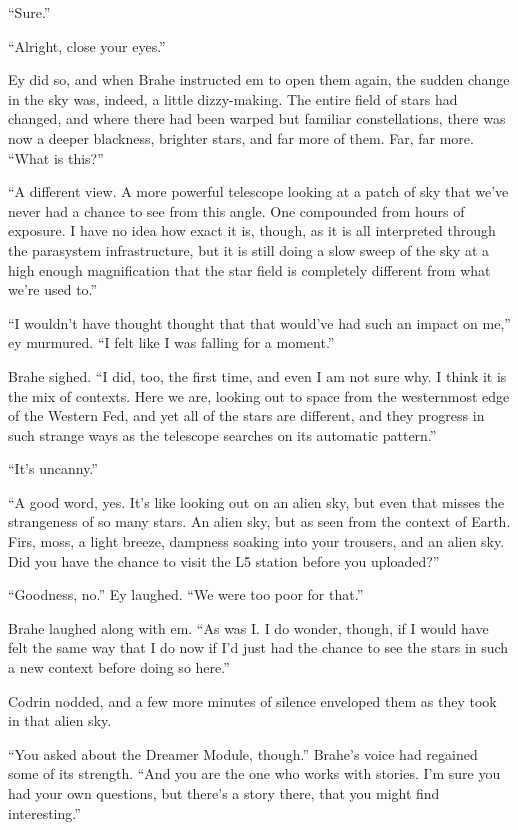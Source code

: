 ``Sure.''

``Alright, close your eyes.''

Ey did so, and when Brahe instructed em to open them again, the sudden change in the sky was, indeed, a little dizzy-making. The entire field of stars had changed, and where there had been warped but familiar constellations, there was now a deeper blackness, brighter stars, and far more of them. Far, far more. ``What is this?''

``A different view. A more powerful telescope looking at a patch of sky that we've never had a chance to see from this angle. One compounded from hours of exposure. I have no idea how exact it is, though, as it is all interpreted through the parasystem infrastructure, but it is still doing a slow sweep of the sky at a high enough magnification that the star field is completely different from what we're used to.''

``I wouldn't have thought thought that that would've had such an impact on me,'' ey murmured. ``I felt like I was falling for a moment.''

Brahe sighed. ``I did, too, the first time, and even I am not sure why. I think it is the mix of contexts. Here we are, looking out to space from the westernmost edge of the Western Fed, and yet all of the stars are different, and they progress in such strange ways as the telescope searches on its automatic pattern.''

``It's uncanny.''

``A good word, yes. It's like looking out on an alien sky, but even that misses the strangeness of so many stars. An alien sky, but as seen from the context of Earth. Firs, moss, a light breeze, dampness soaking into your trousers, and an alien sky. Did you have the chance to visit the L5 station before you uploaded?''

``Goodness, no.'' Ey laughed. ``We were too poor for that.''

Brahe laughed along with em. ``As was I. I do wonder, though, if I would have felt the same way that I do now if I'd just had the chance to see the stars in such a new context before doing so here.''

Codrin nodded, and a few more minutes of silence enveloped them as they took in that alien sky.

``You asked about the Dreamer Module, though.'' Brahe's voice had regained some of its strength. ``And you are the one who works with stories. I'm sure you had your own questions, but there's a story there, that you might find interesting.''

